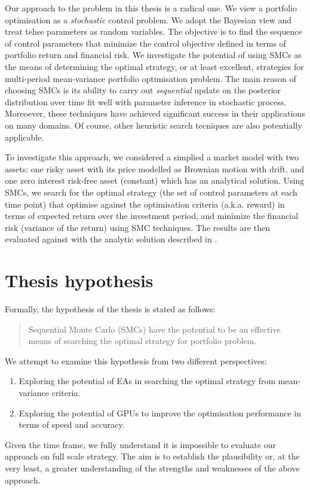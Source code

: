 Our approach to the problem in this thesis is a radical one. We view a portfolio optimisation as a \emph{stochastic} control problem. We adopt the Bayesian view and treat tehse parameters as random variables. The objective is to find the sequence of control parameters that minimize the control objective defined in terms of portfolio return and financial risk. We investigate the potential of using SMCs as the means of determining the optimal strategy, or at least excellent, strategies for multi-period mean-variance portfolio optimisation problem. The main reason of choosing SMCs is its ability to carry out \emph{sequential} update on the posterior distribution over time fit well with parameter inference in stochastic process. Moreoever, these techniques have achieved significant success in their applications on many domains. Of course, other heuristic search tecniques are also potentially applicable.

To investigate this approach, we considered a simplied a market model with two assets: one risky asset with its price modelled as Brownian motion with drift, and one zero interest risk-free asset (constant) which has an analytical solution. Using SMCs, we search for the optimal strategy (the set of control parameters at each time point) that optimise against the optimisation criteria (a.k.a. reward) in terms of expected return over the investment period, and minimize the financial risk (variance of the return) using SMC techniques. The results are then evaluated against with the analytic solution described in \cite{}.

\section{Thesis hypothesis}
Formally, the hypothesis of the thesis is stated as follows:
\begin{quote}
Sequential Monte Carlo (SMCs) have the potential to be an effective means of searching the optimal strategy for portfolio problem.
\end{quote}
We attempt to examine this hypothesis from two different perspectives:
\begin{enumerate}
\item Exploring the potential of EAs in searching the optimal strategy from mean-variance criteria.
\item Exploring the potential of GPUs to improve the optimisation performance in terms of speed and accuracy.
\end{enumerate}
Given the time frame, we fully understand it is impossible to evaluate our approach on full scale strategy. The aim is to establish the plausibility or, at the very least, a greater understanding of the strengths and weaknesses of the above approach.

